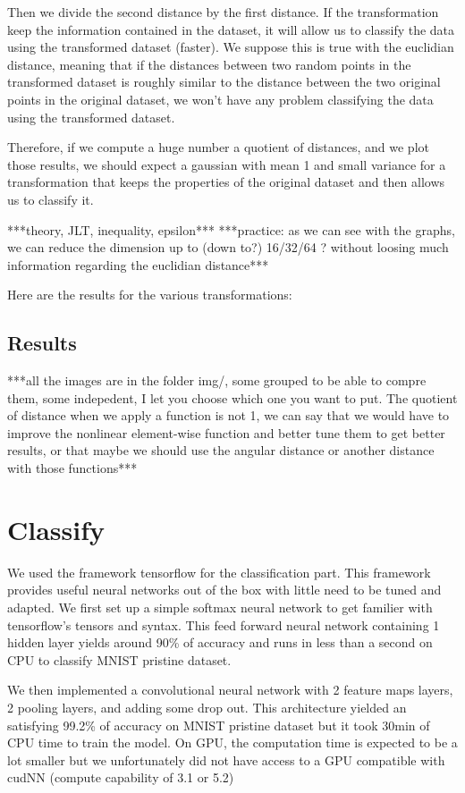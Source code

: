 \documentclass[11pt,a4paper]{article}
\begin{document}
	Then we divide the second distance by the first distance. If the transformation keep the information contained in the dataset, it will allow us to classify the data using the transformed dataset (faster). We suppose this is true with the euclidian distance, meaning that if the distances between two random points in the transformed dataset is roughly similar to the distance between the two original points in the original dataset, we won't have any problem classifying the data using the transformed dataset.
	
	
	Therefore, if we compute a huge number a quotient of distances, and we plot those results, we should expect a gaussian with mean 1 and small variance for a transformation that keeps the properties of the original dataset and then allows us to classify it.
	
	
	***theory, JLT, inequality, epsilon***
	***practice: as we can see with the graphs, we can reduce the dimension up to (down to?) 16/32/64 ? without loosing much information regarding the euclidian distance***
	
	Here are the results for the various transformations:
	
	
	\subsection{Results}
	
	***all the images are in the folder img/, some grouped to be able to compre them, some indepedent, I let you choose which one you want to put. The quotient of distance when we apply a function is not 1, we can say that we would have to improve the nonlinear element-wise function and better tune them to get better results, or that maybe we should use the angular distance or another distance with those functions***
	
	\section{Classify}
	We used the framework tensorflow for the classification part. This framework provides useful neural networks out of the box with little need to be tuned and adapted. We first set up a simple softmax neural network to get familier with tensorflow's tensors and syntax. This feed forward neural network containing 1 hidden layer yields around 90\% of accuracy and runs in less than a second on CPU to classify MNIST pristine dataset.
	
	
	We then implemented a convolutional neural network with 2 feature maps layers, 2 pooling layers, and adding some drop out. This architecture yielded an satisfying 99.2\% of accuracy on MNIST pristine dataset but it took 30min of CPU time to train the model. On GPU, the computation time is expected to be a lot smaller but we unfortunately did not have access to a GPU compatible with cudNN (compute capability of 3.1 or 5.2)
	
\end{document}
